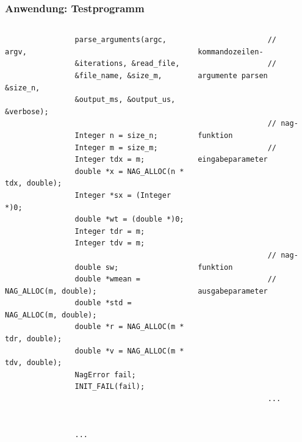 \documentclass{beamer}
\begin{document}
\begin{frame}[fragile]
  \frametitle{Anwendung: Testprogramm}
	
	\begin{columns}
			\begin{lstlisting}
				parse_arguments(argc, argv,
				&iterations, &read_file,
				&file_name, &size_m, &size_n,
				&output_ms, &output_us, &verbose);
				
				Integer n = size_n;
				Integer m = size_m;
				Integer tdx = m;
				double *x = NAG_ALLOC(n * tdx, double);
				Integer *sx = (Integer *)0;
				double *wt = (double *)0;
				Integer tdr = m;
				Integer tdv = m;
				
				double sw;
				double *wmean = NAG_ALLOC(m, double);
				double *std = NAG_ALLOC(m, double);
				double *r = NAG_ALLOC(m * tdr, double);
				double *v = NAG_ALLOC(m * tdv, double);
				NagError fail;
				INIT_FAIL(fail);
				
				
				
				...
			\end{lstlisting}
			\begin{lstlisting}
				// kommandozeilen-
				// argumente parsen
				
				
				
				// nag-funktion
				// eingabeparameter
				
				
				
				
				
				
				
				// nag-funktion
				// ausgabeparameter
				
				
				
				
				
				
				
				
				...
			\end{lstlisting}
	\end{columns}
\end{frame}
\end{document}
